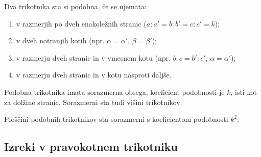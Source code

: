         

        
        
            \begin{izrek}
                Dva trikotnika sta si podobna, če se ujemata:
                \begin{enumerate}
                    \item v razmerjih po dveh enakoležnih stranic ($a:a'=b:b'=c:c'=k$);
                    \item v dveh notranjih kotih (npr. $\alpha=\alpha'$, $\beta=\beta'$);
                    \item v razmerju dveh stranic in v vmesnem kotu (npr. $b:c=b':c'$, $\alpha=\alpha'$);
                    \item v razmerju dveh stranic in v kotu nasproti daljše.
                \end{enumerate}
            \end{izrek}

            \begin{izrek}
                Podobna trikotnika imata sorazmerna obsega, koeficient podobnosti je $k$, isti kot za dolžine stranic.
                Sorazmerni sta tudi višini trikotnikov.

                Ploščini podobnih trikotnikov sta sorazmerni s koeficientom podobnosti $k^2$.
            \end{izrek}
        

        
        
            \subsection*{Izreki v pravokotnem trikotniku}



